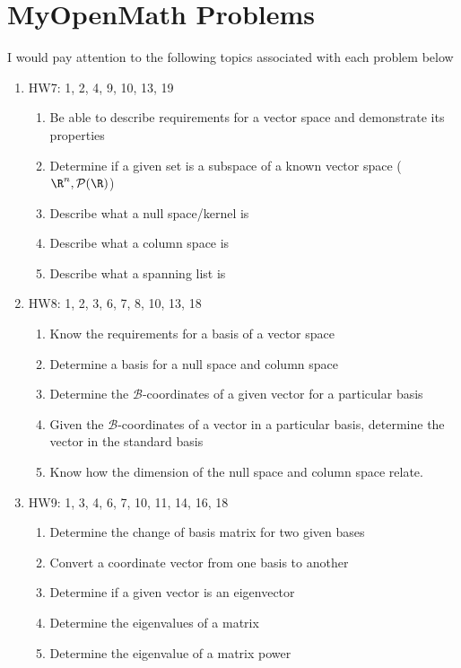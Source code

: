 \documentclass[12pt]{exam}
\begin{document}
\section{MyOpenMath Problems}
I would pay attention to the following topics associated with each problem below
\begin{enumerate}
    \item HW7: 1, 2, 4, 9, 10, 13, 19
        \begin{enumerate}
            \item Be able to describe requirements for a vector space and demonstrate its properties
            \item Determine if a given set is a subspace of a known vector space ($\R^n,\mathcal{P}(\R)$)
            \item Describe what a null space/kernel is
            \item Describe what a column space is
            \item Describe what a spanning list is
        \end{enumerate}
    \item HW8: 1, 2, 3, 6, 7, 8, 10, 13, 18
        \begin{enumerate}
            \item Know the requirements for a basis of a vector space
            \item Determine a basis for a null space and column space
            \item Determine the $\mathcal{B}$-coordinates of a given vector for a particular basis
            \item Given the $\mathcal{B}$-coordinates of a vector in a particular basis, determine the vector in the standard basis
            \item Know how the dimension of the null space and column space relate.
        \end{enumerate}
    \item HW9: 1, 3, 4, 6, 7, 10, 11, 14, 16, 18
        \begin{enumerate}
            \item Determine the change of basis matrix for two given bases
            \item Convert a coordinate vector from one basis to another
            \item Determine if a given vector is an eigenvector
            \item Determine the eigenvalues of a matrix
            \item Determine the eigenvalue of a matrix power

\end{enumerate}
\end{enumerate}
\end{document}
